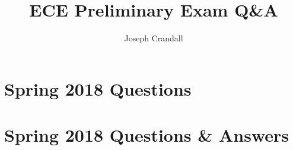 
\usepackage{algorithm, algpseudocode, chemformula, color, gensymb, siunitx, soul, subfiles}
\usepackage[a4paper, total={7.5in, 9.5in}]{geometry}

\title{ECE Preliminary Exam Q\&A}
\author{Joseph Crandall}


\maketitle

%

\section{Spring 2018 Questions}


\section{Spring 2018 Questions \& Answers}


%

%

%

%

%

%


